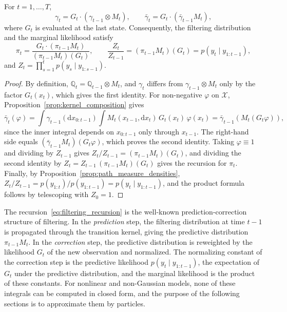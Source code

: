 \begin{proposition}
    \label{prop:filtering_recursion}
    For $t=1,\ldots,T$,
    \begin{equation}
        \gamma_t = G_t\cdot\left(\gamma_{t-1}\otimes M_t\right), \qquad
        \bar{\gamma}_t = G_t\cdot\left(\bar{\gamma}_{t-1}M_t\right),
        \label{eq:unnormalized_recursion}
    \end{equation}
    where $G_t$ is evaluated at the last state. Consequently, the filtering distribution and the marginal likelihood satisfy
    \begin{equation}
        \pi_t = \frac{G_t\cdot(\pi_{t-1}M_t)}{(\pi_{t-1}M_t)(G_t)}, \qquad
        \frac{Z_t}{Z_{t-1}} = (\pi_{t-1}M_t)(G_t) = p(y_t\mid y_{1:t-1}),
        \label{eq:filtering_recursion}
    \end{equation}
    and $Z_t = \prod_{s=1}^{t}p(y_s\mid y_{1:s-1})$.
\end{proposition}
\begin{proof}
    By definition, $\mathbb{Q}_t = \mathbb{Q}_{t-1}\otimes M_t$, and $\gamma_t$ differs from $\gamma_{t-1}\otimes M_t$ only by the factor $G_t(x_t)$, which gives the first identity. For non-negative $\varphi$ on $\mathcal{X}$, Proposition~\ref{prop:kernel_composition} gives
    \begin{equation}
        \bar{\gamma}_t(\varphi) = \int\gamma_{t-1}(\mathrm{d}x_{0:t-1})\int M_t(x_{t-1},\mathrm{d}x_t)\,G_t(x_t)\,\varphi(x_t) = \bar{\gamma}_{t-1}\left(M_t(G_t\varphi)\right),
    \end{equation}
    since the inner integral depends on $x_{0:t-1}$ only through $x_{t-1}$. The right-hand side equals $(\bar{\gamma}_{t-1}M_t)(G_t\varphi)$, which proves the second identity. Taking $\varphi\equiv1$ and dividing by $Z_{t-1}$ gives $Z_t/Z_{t-1} = (\pi_{t-1}M_t)(G_t)$, and dividing the second identity by $Z_t = Z_{t-1}\,(\pi_{t-1}M_t)(G_t)$ gives the recursion for $\pi_t$. Finally, by Proposition~\ref{prop:path_measure_densities}, $Z_t/Z_{t-1} = p(y_{1:t})/p(y_{1:t-1}) = p(y_t\mid y_{1:t-1})$, and the product formula follows by telescoping with $Z_0 = 1$.
\end{proof}

The recursion~\eqref{eq:filtering_recursion} is the well-known prediction-correction structure of filtering. In the \emph{prediction} step, the filtering distribution at time $t-1$ is propagated through the transition kernel, giving the predictive distribution $\pi_{t-1}M_t$. In the \emph{correction} step, the predictive distribution is reweighted by the likelihood $G_t$ of the new observation and normalized. The normalizing constant of the correction step is the predictive likelihood $p(y_t\mid y_{1:t-1})$, the expectation of $G_t$ under the predictive distribution, and the marginal likelihood is the product of these constants. For nonlinear and non-Gaussian models, none of these integrals can be computed in closed form, and the purpose of the following sections is to approximate them by particles.

